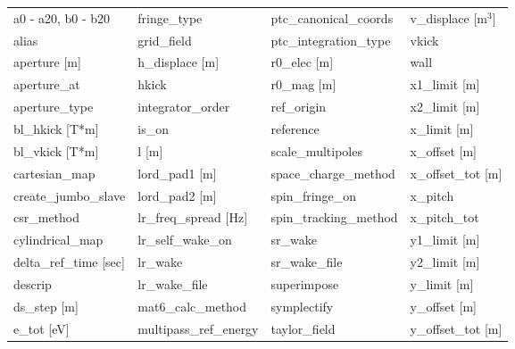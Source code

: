  \begin{tabular}{llll} \toprule
a0 - a20, b0 - b20             & fringe_type                    & ptc_canonical_coords           & v_displace [m$^3$]             \\
alias                          & grid_field                     & ptc_integration_type           & vkick                          \\
aperture [m]                   & h_displace [m]                 & r0_elec [m]                    & wall                           \\
aperture_at                    & hkick                          & r0_mag [m]                     & x1_limit [m]                   \\
aperture_type                  & integrator_order               & ref_origin                     & x2_limit [m]                   \\
bl_hkick [T*m]                 & is_on                          & reference                      & x_limit [m]                    \\
bl_vkick [T*m]                 & l [m]                          & scale_multipoles               & x_offset [m]                   \\
cartesian_map                  & lord_pad1 [m]                  & space_charge_method            & x_offset_tot [m]               \\
create_jumbo_slave             & lord_pad2 [m]                  & spin_fringe_on                 & x_pitch                        \\
csr_method                     & lr_freq_spread [Hz]            & spin_tracking_method           & x_pitch_tot                    \\
cylindrical_map                & lr_self_wake_on                & sr_wake                        & y1_limit [m]                   \\
delta_ref_time [sec]           & lr_wake                        & sr_wake_file                   & y2_limit [m]                   \\
descrip                        & lr_wake_file                   & superimpose                    & y_limit [m]                    \\
ds_step [m]                    & mat6_calc_method               & symplectify                    & y_offset [m]                   \\
e_tot [eV]                     & multipass_ref_energy           & taylor_field                   & y_offset_tot [m]               \\

\end{tabular}
